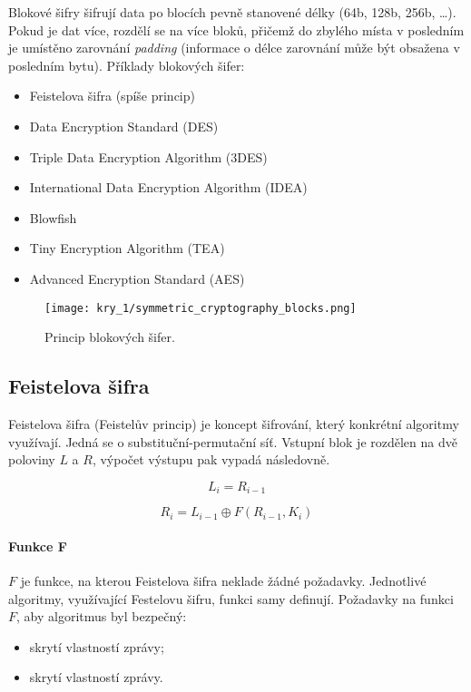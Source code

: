 Blokové šifry šifrují data po blocích pevně stanovené délky (64b, 128b, 256b, \dots). Pokud je dat více, rozdělí se na více bloků, přičemž do zbylého místa v posledním je umístěno zarovnání \textit{padding} (informace o délce zarovnání může být obsažena v posledním bytu). Příklady blokových šifer: \begin{itemize}
    \item Feistelova šifra (spíše princip)
    \item Data Encryption Standard (DES)
    \item Triple Data Encryption Algorithm (3DES)
    \item International Data Encryption Algorithm (IDEA)
    \item Blowfish
    \item Tiny Encryption Algorithm (TEA)
    \item Advanced Encryption Standard (AES)
\end{itemize}

\begin{figure}[H]
    \centering
    \texttt{[image: kry\_1/symmetric\_cryptography\_blocks.png]}
    \caption{Princip blokových šifer.}
\end{figure}

\subsection*{Feistelova šifra}

Feistelova šifra (Feistelův princip) je koncept šifrování, který konkrétní algoritmy využívají. Jedná se o substituční-permutační síť. Vstupní blok je rozdělen na dvě poloviny $L$ a $R$, výpočet výstupu pak vypadá následovně.

\begin{equation}
    L_i = R_{i-1}
\end{equation}

\begin{equation}
    R_i = L_{i-1} \oplus F(R_{i-1}, K_i)
\end{equation}

\paragraph*{Funkce F} $F$ je funkce, na kterou Feistelova šifra neklade žádné požadavky. Jednotlivé algoritmy, využívající Festelovu šifru, funkci samy definují. Požadavky na funkci $F$, aby algoritmus byl bezpečný: \begin{itemize}
    \item skrytí vlastností zprávy;
    \item skrytí vlastností zprávy.
\end{itemize}

